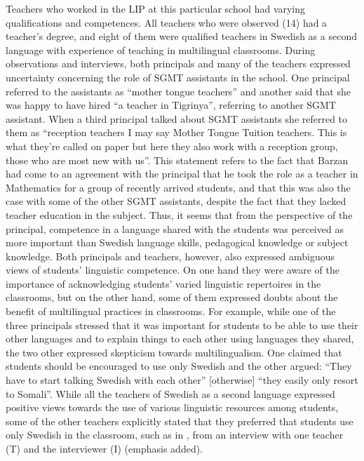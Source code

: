 \documentclass[output=paper]{langscibook}
\begin{document}
Teachers who worked in the LIP at this particular school had varying qualifications and competences. All teachers who were observed (14) had a teacher’s degree, and eight of them were qualified teachers in Swedish as a second language with experience of teaching in multilingual classrooms.  During observations and interviews, both principals and many of the teachers expressed uncertainty concerning the role of SGMT assistants in the school. One principal referred to the assistants as “mother tongue teachers” and another said that she was happy to have hired “a teacher in Tigrinya”, referring to another SGMT assistant. When a third principal talked about SGMT assistants she referred to them as “reception teachers I may say Mother Tongue Tuition teachers. This is what they’re called on paper but here they also work with a reception group, those who are most new with us”. This statement refers to the fact that Barzan had come to an agreement with the principal that he took the role as a teacher in Mathematics for a group of recently arrived students, and that this was also the case with some of the other SGMT assistants, despite the fact that they lacked teacher education in the subject. Thus, it seems that from the perspective of the principal, competence in a language shared with the students was perceived as more important than Swedish language skills, pedagogical knowledge or subject knowledge. Both principals and teachers, however, also expressed ambiguous views of students’ linguistic competence. On one hand they were aware of the importance of acknowledging students’ varied linguistic repertoires in the classrooms, but on the other hand, some of them expressed doubts about the benefit of multilingual practices in classrooms. For example, while one of the three principals stressed that it was important for students to be able to use their other languages and to explain things to each other using languages they shared, the two other expressed skepticism towards multilingualism. One claimed that students should be encouraged to use only Swedish and the other argued: “They have to start talking Swedish with each other” [otherwise] “they easily only resort to Somali”. While all the teachers of Swedish as a second language expressed positive views towards the use of various linguistic resources among students, some of the other teachers explicitly stated that they preferred that students use only Swedish in the classroom, such as in , from an interview with one teacher (T) and the interviewer (I) (emphasis added).
\end{document}
